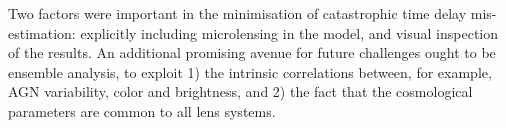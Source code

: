 Two factors were important in the minimisation of catastrophic time
delay mis-estimation: explicitly including microlensing in the model,
and  visual inspection of the results. An additional promising avenue
for future challenges ought to be ensemble analysis, to exploit 1) the
intrinsic correlations between, for example, AGN variability, color and
brightness, and 2) the fact that  the cosmological parameters are common
to all lens systems.
